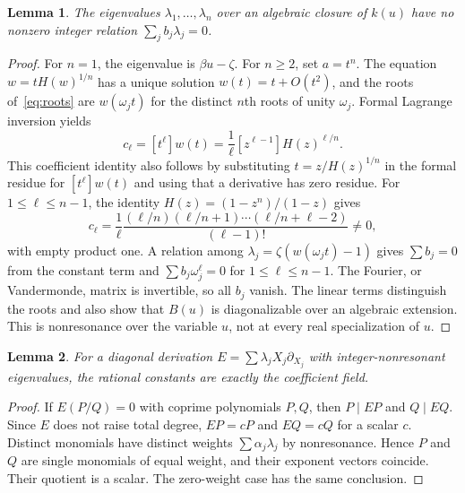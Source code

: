 \documentclass[11pt,a4paper]{article}
\newtheorem{lemma}{Lemma}
\begin{document}
\begin{lemma}\label{lem:nonres}
The eigenvalues $\lambda_1,\ldots,\lambda_n$ over an algebraic closure of $k(u)$ have no nonzero integer relation $\sum_j b_j\lambda_j=0$.
\end{lemma}
\begin{proof}
For $n=1$, the eigenvalue is $\beta u-\zeta$. For $n\geq2$, set $a=t^n$. The equation $w=tH(w)^{1/n}$ has a unique solution $w(t)=t+O(t^2)$, and the roots of~\eqref{eq:roots} are $w(\omega_jt)$ for the distinct $n$th roots of unity $\omega_j$. Formal Lagrange inversion yields
\begin{equation}
 c_\ell=[t^\ell]w(t)=\frac1\ell[z^{\ell-1}]H(z)^{\ell/n}.
\end{equation}
This coefficient identity also follows by substituting $t=z/H(z)^{1/n}$ in the formal residue for $[t^\ell]w(t)$ and using that a derivative has zero residue. For $1\leq\ell\leq n-1$, the identity $H(z)=(1-z^n)/(1-z)$ gives
\begin{equation}
 c_\ell=\frac1\ell\frac{(\ell/n)(\ell/n+1)\cdots(\ell/n+\ell-2)}{(\ell-1)!}\ne0,
\end{equation}
with empty product one. A relation among $\lambda_j=\zeta(w(\omega_jt)-1)$ gives $\sum b_j=0$ from the constant term and $\sum b_j\omega_j^\ell=0$ for $1\leq\ell\leq n-1$. The Fourier, or Vandermonde, matrix is invertible, so all $b_j$ vanish. The linear terms distinguish the roots and also show that $B(u)$ is diagonalizable over an algebraic extension. This is nonresonance over the variable $u$, not at every real specialization of $u$.
\end{proof}

\begin{lemma}\label{lem:linear}
For a diagonal derivation $E=\sum\lambda_jX_j\partial_{X_j}$ with integer-nonresonant eigenvalues, the rational constants are exactly the coefficient field.
\end{lemma}
\begin{proof}
If $E(P/Q)=0$ with coprime polynomials $P,Q$, then $P\mid EP$ and $Q\mid EQ$. Since $E$ does not raise total degree, $EP=cP$ and $EQ=cQ$ for a scalar $c$. Distinct monomials have distinct weights $\sum\alpha_j\lambda_j$ by nonresonance. Hence $P$ and $Q$ are single monomials of equal weight, and their exponent vectors coincide. Their quotient is a scalar. The zero-weight case has the same conclusion.
\end{proof}
\end{document}
